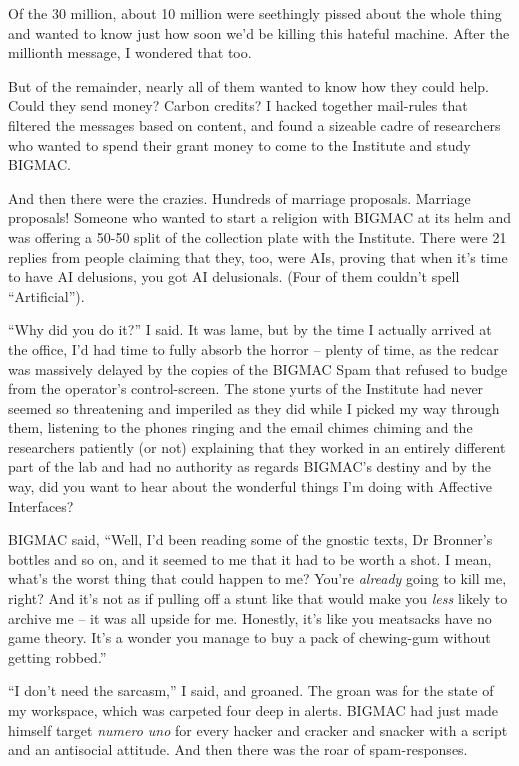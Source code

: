 Of the 30 million, about 10 million were seethingly pissed about the 
whole thing and wanted to know just how soon we'd be killing this 
hateful machine. After the millionth message, I wondered that too.

But of the remainder, nearly all of them wanted to know how they could 
help. Could they send money? Carbon credits? I hacked together 
mail-rules that filtered the messages based on content, and found a 
sizeable cadre of researchers who wanted to spend their grant money to 
come to the Institute and study BIGMAC.

And then there were the crazies. Hundreds of marriage proposals. 
Marriage proposals! Someone who wanted to start a religion with BIGMAC 
at its helm and was offering a 50-50 split of the collection plate with 
the Institute. There were 21 replies from people claiming that they, 
too, were AIs, proving that when it's time to have AI delusions, you 
got AI delusionals. (Four of them couldn't spell “Artificial”).

“Why did you do it?” I said. It was lame, but by the time I 
actually arrived at the office, I'd had time to fully absorb the horror 
-- plenty of time, as the redcar was massively delayed by the copies of 
the BIGMAC Spam that refused to budge from the operator's 
control-screen. The stone yurts of the Institute had never seemed so 
threatening and imperiled as they did while I picked my way through 
them, listening to the phones ringing and the email chimes chiming and 
the researchers patiently (or not) explaining that they worked in an 
entirely different part of the lab and had no authority as regards 
BIGMAC's destiny and by the way, did you want to hear about the 
wonderful things I'm doing with Affective Interfaces?

BIGMAC said, “Well, I'd been reading some of the gnostic texts, Dr 
Bronner's bottles and so on, and it seemed to me that it had to be 
worth a shot. I mean, what's the worst thing that could happen to me? 
You're \emph{already} going to kill me, right? And it's not as if 
pulling off a stunt like that would make you \emph{less} likely to 
archive me -- it was all upside for me. Honestly, it's like you 
meatsacks have no game theory. It's a wonder you manage to buy a pack 
of chewing-gum without getting robbed.”

“I don't need the sarcasm,” I said, and groaned. The groan was for 
the state of my workspace, which was carpeted four deep in alerts. 
BIGMAC had just made himself target \emph{numero uno} for every hacker 
and cracker and snacker with a script and an antisocial attitude. And 
then there was the roar of spam-responses.

